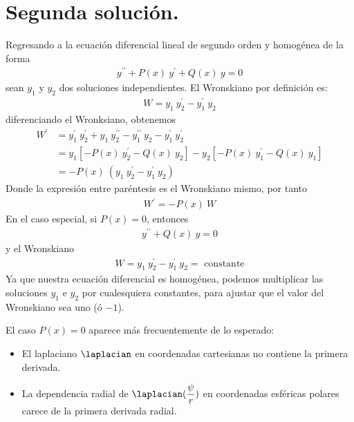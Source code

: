 \section{Segunda solución.}
Regresando a la ecuación diferencial lineal de segundo orden y homogénea de la forma
\begin{align}
y^{\prime \prime} + P(x) \: y^{\prime} + Q(x) \: y = 0
\label{eq:ecuacion_09_118}
\end{align}
sean $y_{1}$ y $y_{2}$ dos soluciones independientes. El Wronskiano por definición es:
\begin{align}
W = y_{1} \: y^{\prime}_{2} - y^{\prime}_{1} \: y_{2}
\label{eq:ecuacion_09_119}
\end{align}
diferenciando el Wronksiano, obtenemos
\begin{align*}
W^{\prime} &= y^{\prime}_{1} \: y_{2}^{\prime} + y_{1} \: y^{\prime \prime}_{2} - y^{\prime \prime}_{1} \: y_{2} - y^{\prime}_{1} \: y^{\prime}_{2} \\
&= y_{1} [ - P(x) \: y^{\prime}_{2} - Q(x) \: y_{2}] - y_{2} [ - P(x) \: y^{\prime}_{1} - Q(x)  \: y_{1}] \\
&= - P(x) \: (y_{1} \: y^{\prime}_{2} - y^{\prime}_{1} \: y_{2})
\end{align*}
Donde la expresión entre paréntesis es el Wronskiano mismo, por tanto
\begin{align}
W^{\prime} = - P(x) \: W
\label{eq:ecuacion_09_120}
\end{align}
En el caso especial, si $P(x) = 0$, entonces
\begin{align}
y^{\prime \prime} + Q(x) \: y = 0
\label{eq:ecuacion_09_121}
\end{align}
y el Wronskiano
\begin{align}
W = y_{1} \: y^{\prime}_{2} - y^{\prime}_{1} \: y_{2} = \mbox{ constante}
\label{eq:ecuacion_09_1202}
\end{align}
Ya que nuestra ecuación diferencial es homogénea, podemos multiplicar las soluciones $y_{1}$ e $y_{2}$ por cualesquiera constantes, para ajustar que el valor del Wronskiano sea uno (ó $-1$).
\par
El caso $P(x) = 0$ aparece más frecuentemente de lo esperado:
\begin{itemize}
\item El laplaciano $\laplacian$ en coordenadas cartesianas no contiene la primera derivada.
\item La dependencia radial de $\laplacian (\dfrac{\psi}{r})$ en coordenadas esféricas polares carece de la primera derivada radial.
\end{itemize}
